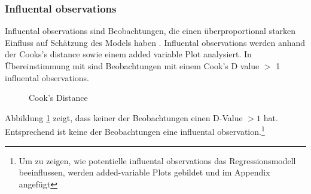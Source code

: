 \documentclass[11pt,a4paper]{article}
\begin{document}
\subsubsection{Influental observations}
Influental observations sind Beobachtungen, die einen überproportional starken Einfluss auf Schätzung des Models haben \parencite{kabacoff2015r}. Influental observations werden anhand der Cooks's distance sowie einem added variable Plot analysiert. In Übereinstimmung mit \textcite{kabacoff2015r} sind Beobachtungen mit einem Cook's D value $>$ 1 influental observations. 

\begin{figure}[!htbp] 
\begin{center}
\caption{Cook's Distance}\label{fig:g}
\scalebox{0.5}{
}
\end{center}
\end{figure} 

Abbildung \ref{fig:g} zeigt, dass keiner der Beobachtungen einen D-Value $>1$ hat. Entsprechend ist keine der Beobachtungen eine influental observation.\footnote{Um zu zeigen, wie potentielle influental observations das Regressionsmodell beeinflussen, werden added-variable Plots gebildet und im Appendix angefügt}\\





\end{document}
